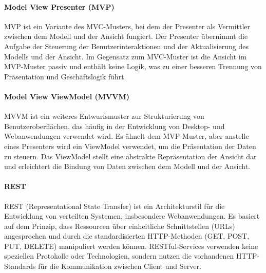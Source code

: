 \paragraph{Model View Presenter (MVP)}

MVP ist ein Variante des MVC-Musters, bei dem der Presenter als Vermittler zwischen dem Modell und der Ansicht fungiert. Der Presenter übernimmt die Aufgabe der Steuerung der Benutzerinteraktionen und der Aktualisierung des Modells und der Ansicht. Im Gegensatz zum MVC-Muster ist die Ansicht im MVP-Muster passiv und enthält keine Logik, was zu einer besseren Trennung von Präsentation und Geschäftslogik führt.

\paragraph{Model View ViewModel (MVVM)}

MVVM ist ein weiteres Entwurfsmuster zur Strukturierung von Benutzeroberflächen, das häufig in der Entwicklung von Desktop- und Webanwendungen verwendet wird. Es ähnelt dem MVP-Muster, aber anstelle eines Presenters wird ein ViewModel verwendet, um die Präsentation der Daten zu steuern. Das ViewModel stellt eine abstrakte Repräsentation der Ansicht dar und erleichtert die Bindung von Daten zwischen dem Modell und der Ansicht.

\paragraph{REST}

REST (Representational State Transfer) ist ein Architekturstil für die Entwicklung von verteilten Systemen, insbesondere Webanwendungen. Es basiert auf dem Prinzip, dass Ressourcen über einheitliche Schnittstellen (URLs) angesprochen und durch die standardisierten HTTP-Methoden (GET, POST, PUT, DELETE) manipuliert werden können. RESTful-Services verwenden keine speziellen Protokolle oder Technologien, sondern nutzen die vorhandenen HTTP-Standards für die Kommunikation zwischen Client und Server.